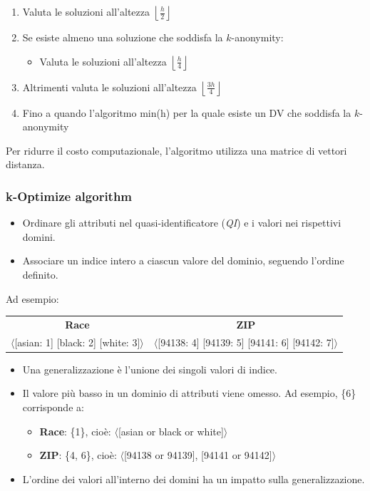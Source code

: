 \documentclass{report}
\begin{document}
\begin{enumerate}
    \item Valuta le soluzioni all'altezza \( \left\lfloor \frac{h}{2} \right\rfloor \)
    \item Se esiste almeno una soluzione che soddisfa la \( k \)-anonymity:
    \begin{itemize}
        \item Valuta le soluzioni all'altezza \( \left\lfloor \frac{h}{4} \right\rfloor \)
    \end{itemize}
    \item Altrimenti valuta le soluzioni all'altezza \( \left\lfloor \frac{3h}{4} \right\rfloor \)
    \item Fino a quando l'algoritmo min(h) per la quale esiste un DV che soddisfa la \( k \)-anonymity
\end{enumerate}

\noindent Per ridurre il costo computazionale, l'algoritmo utilizza una matrice di vettori distanza.

\newpage
\subsubsection{k-Optimize algorithm}

\begin{itemize}
    \item Ordinare gli attributi nel quasi-identificatore (\textit{QI}) e i valori nei rispettivi domini.
    \item Associare un indice intero a ciascun valore del dominio, seguendo l'ordine definito.
\end{itemize}

\noindent Ad esempio:
\begin{center}
    \begin{tabular}{cc}
        \textbf{Race} & \textbf{ZIP} \\
        $\langle$[asian: 1] [black: 2] [white: 3]$\rangle$ & $\langle$[94138: 4] [94139: 5] [94141: 6] [94142: 7]$\rangle$ \\
    \end{tabular}
\end{center}

\begin{itemize}
    \item Una generalizzazione è l'unione dei singoli valori di indice.
    \item Il valore più basso in un dominio di attributi viene omesso. Ad esempio, \{6\} corrisponde a:
    \begin{itemize}
        \item \textbf{Race}: \{1\}, cioè: $\langle$[asian or black or white]$\rangle$
        \item \textbf{ZIP}: \{4, 6\}, cioè: $\langle$[94138 or 94139], [94141 or 94142]$\rangle$
    \end{itemize}
    \item L'ordine dei valori all'interno dei domini ha un impatto sulla generalizzazione.
\end{itemize}
\end{document}
